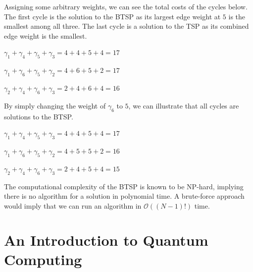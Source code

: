 \documentclass[msc,oneside]{ubcthesis}
\begin{document}
Assigning some arbitrary weights, we can see the total costs of the cycles below. The first cycle is the solution to the BTSP as its largest edge weight at $5$ is the smallest among all three. The last cycle is a solution to the TSP as its combined edge weight is the smallest.
\begin{center}
	$\gamma_1 + \gamma_4 + \gamma_5 + \gamma_3 = 4 + 4 + 5 + 4 = 17$
	
	$ \gamma_1 + \gamma_6 + \gamma_5 + \gamma_2 = 4 + 6 + 5 + 2 = 17$
	
	$  \gamma_2 + \gamma_4 + \gamma_6 + \gamma_3 = 2 + 4 + 6 + 4 = 16$
\end{center}


By simply changing the weight of $\gamma_6$ to $5$, we can illustrate that all cycles are solutions to the BTSP. 

\begin{center}
	
	$\gamma_1 + \gamma_4 + \gamma_5 + \gamma_3 = 4 + 4 + 5 + 4 = 17$
	
	$ \gamma_1 + \gamma_6 + \gamma_5 + \gamma_2 = 4 + 5 + 5 + 2 = 16$
	
	$  \gamma_2 + \gamma_4 + \gamma_6 + \gamma_3 = 2 + 4 + 5 + 4 = 15$
\end{center}

The computational complexity of the BTSP is known to be NP-hard, implying there is no algorithm for a solution in polynomial time. A brute-force approach would imply that we can run an algorithm in $\mathcal{O}((N-1)!)$ time.
	
	\section{An Introduction to Quantum Computing}
	
\end{document}

